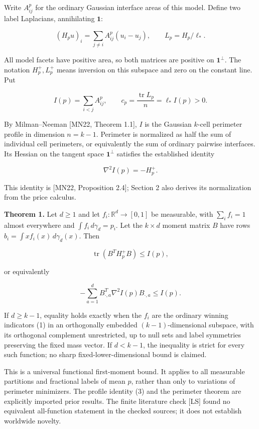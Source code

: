 \documentclass[
  11pt,
]{article}
\begin{document}
Write \(A_{ij}^p\) for the ordinary Gaussian interface areas of this
model. Define two label Laplacians, annihilating \(\mathbf1\):

\[
 (H_pu)_i=\sum_{j\ne i}A_{ij}^p(u_i-u_j),\qquad
 L_p=H_p/\ell_*.
\]

All model facets have positive area, so both matrices are positive on
\(\mathbf1^\perp\). The notation \(H_p^+,L_p^+\) means inversion on this
subspace and zero on the constant line. Put

\[
 I(p)=\sum_{i<j}A_{ij}^p,\qquad
 c_p=\frac{\operatorname{tr}L_p}{n}=\ell_*I(p)>0.          \tag{2}
\]

By Milman--Neeman {[}MN22, Theorem 1.1{]}, \(I\) is the Gaussian
\(k\)-cell perimeter profile in dimension \(n=k-1\). Perimeter is
normalized as half the sum of individual cell perimeters, or
equivalently the sum of ordinary pairwise interfaces. Its Hessian on the
tangent space \(\mathbf1^\perp\) satisfies the established identity

\[
                         \nabla^2 I(p)=-H_p^+.           \tag{3}
\]

This identity is {[}MN22, Proposition 2.4{]}; Section 2 also derives its
normalization from the price calculus.

\textbf{Theorem 1.} Let \(d\ge1\) and let \(f_i:\mathbb R^d\to[0,1]\) be
measurable, with \(\sum_i f_i=1\) almost everywhere and
\(\int f_i\,d\gamma_d=p_i\). Let the \(k\times d\) moment matrix \(B\)
have rows \(b_i=\int xf_i(x)\,d\gamma_d(x)\). Then

\[
 \operatorname{tr}(B^TH_p^+B)\le I(p),                    \tag{4}
\]

or equivalently

\[
 -\sum_{a=1}^d B_{\cdot,a}^T\nabla^2 I(p)B_{\cdot,a}\le I(p).
                                                               \tag{5}
\]

If \(d\ge k-1\), equality holds exactly when the \(f_i\) are the
ordinary winning indicators (1) in an orthogonally embedded
\((k-1)\)-dimensional subspace, with its orthogonal complement
unrestricted, up to null sets and label symmetries preserving the fixed
mass vector. If \(d<k-1\), the inequality is strict for every such
function; no sharp fixed-lower-dimensional bound is claimed.

This is a universal functional first-moment bound. It applies to all
measurable partitions and fractional labels of mean \(p\), rather than
only to variations of perimeter minimizers. The profile identity (3) and
the perimeter theorem are explicitly imported prior results. The finite
literature check {[}LS{]} found no equivalent all-function statement in
the checked sources; it does not establish worldwide novelty.
\end{document}

